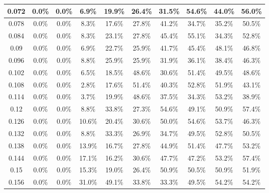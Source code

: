 \begin{table}[H]
\begin{tabular}{|c|c|c|c|c|c|c|c|c|c|}
\hline
0.072 & \cellcolor{green!25}0.0\% & \cellcolor{green!25}0.0\% & 6.9\% & 19.9\% & 26.4\% & 31.5\% & 54.6\% & 44.0\% & 56.0\% \\
\hline
0.078 & \cellcolor{green!25}0.0\% & \cellcolor{green!25}0.0\% & 8.3\% & 17.6\% & 27.8\% & 41.2\% & 34.7\% & 35.2\% & 50.5\% \\
\hline
0.084 & \cellcolor{green!25}0.0\% & \cellcolor{green!25}0.0\% & 8.3\% & 23.1\% & 27.8\% & 45.4\% & 55.1\% & 34.3\% & 52.8\% \\
\hline
0.09 & \cellcolor{green!25}0.0\% & \cellcolor{green!25}0.0\% & 6.9\% & 22.7\% & 25.9\% & 41.7\% & 45.4\% & 48.1\% & 46.8\% \\
\hline
0.096 & \cellcolor{green!25}0.0\% & \cellcolor{green!25}0.0\% & 8.8\% & 25.9\% & 25.9\% & 31.9\% & 36.1\% & 38.4\% & 46.3\% \\
\hline
0.102 & \cellcolor{green!25}0.0\% & \cellcolor{green!25}0.0\% & 6.5\% & 18.5\% & 48.6\% & 30.6\% & 51.4\% & 49.5\% & 48.6\% \\
\hline
0.108 & \cellcolor{green!25}0.0\% & \cellcolor{green!25}0.0\% & \cellcolor{green!25}2.8\% & 17.6\% & 51.4\% & 40.3\% & 52.8\% & 51.9\% & 43.1\% \\
\hline
0.114 & \cellcolor{green!25}0.0\% & \cellcolor{green!25}0.0\% & 3.7\% & 19.9\% & 48.6\% & 37.5\% & 34.3\% & 53.2\% & 38.9\% \\
\hline
0.12 & \cellcolor{green!25}0.0\% & \cellcolor{green!25}0.0\% & 8.8\% & 33.8\% & 27.3\% & 54.6\% & 49.1\% & 50.9\% & 57.4\% \\
\hline
0.126 & \cellcolor{green!25}0.0\% & \cellcolor{green!25}0.0\% & 10.6\% & 20.4\% & 30.6\% & 50.0\% & 54.6\% & 53.7\% & 46.3\% \\
\hline
0.132 & \cellcolor{green!25}0.0\% & \cellcolor{green!25}0.0\% & 8.8\% & 33.3\% & 26.9\% & 34.7\% & 49.5\% & 52.8\% & 50.5\% \\
\hline
0.138 & \cellcolor{green!25}0.0\% & \cellcolor{green!25}0.0\% & 13.9\% & 16.7\% & 27.8\% & 44.9\% & 51.4\% & 47.7\% & 53.2\% \\
\hline
0.144 & \cellcolor{green!25}0.0\% & \cellcolor{green!25}0.0\% & 17.1\% & 16.2\% & 30.6\% & 47.7\% & 47.2\% & 53.2\% & 57.4\% \\
\hline
0.15 & \cellcolor{green!25}0.0\% & \cellcolor{green!25}0.0\% & 15.3\% & 19.0\% & 26.4\% & 50.9\% & 50.5\% & 50.9\% & 51.9\% \\
\hline
0.156 & \cellcolor{green!25}0.0\% & \cellcolor{green!25}0.0\% & 31.0\% & 49.1\% & 33.8\% & 33.3\% & 49.5\% & 54.2\% & 54.2\% \\

\end{tabular}
\end{table}
